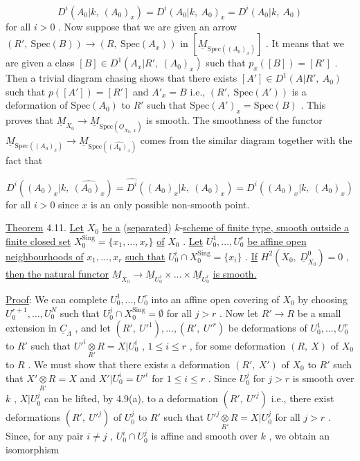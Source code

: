 $$D^i(A_0|k,\ (A_0)_x) = D^i(A_0|k,\ A_0)_x = D^i(A_0|k,\ A_0)$$
for all  $i > 0$ . Now suppose that we are given an arrow $(R',\ \mathrm{Spec}(B)) \to (R,\ \mathrm{Spec}(A_x))$  in  $[\underline{M}_{\mathrm{Spec}((A_0)_x)}]$ . It means that we are given a class $[B] \in D^1(A_x|R',\ (A_0)_x)$  such that  $p_x([B]) = [R']$ . Then a trivial diagram chasing shows that there exists $[A'] \in D^1(A|R',\ A_0)$  such that $p([A']) = [R']$  and  $A'_x = B$  i.e.,  $(R',\ \mathrm{Spec}(A'))$  is a deformation of  $\mathrm{Spec}(A_0)$ to  $R'$  such that  $\mathrm{Spec}(A')_x = \mathrm{Spec}(B)$ . This proves that $\underline{M}_{X_0} \to \underline{M}_{\mathrm{Spec}(\underline{O}_{X_0,\ x})}$ is smooth. The smoothness of the functor  $\underline{M}_{\mathrm{Spec}((A_0)_x)} \to \underline{M}_{\mathrm{Spec}(\widehat{(A_0)_x})}$ comes from the similar diagram together with the fact that

$$D^i((A_0)_x|k,\ \widehat{(A_0)_x}) = \widehat{D^i}((A_0)_x|k,\ (A_0)_x) = D^i((A_0)_x|k,\ (A_0)_x)$$
for all  $i > 0$  since  $x$  is an only possible non-smooth point.

\underline{Theorem} 4.11.  \underline{Let}  $X_0$  \underline{be a} (\underline{separated}) $k$-\underline{scheme of finite type, smooth outside a finite closed set}  $X_0^{\mathrm{Sing}} = \{x_1,\dots,x_r\}$  \underline{of}  $X_0$ . \underline{Let}  $U_0^1,\dots,U_0^r$  \underline{be affine open neighbourhoods of}  $x_1,\dots,x_r$  \underline{such that}  $U_0^i \cap X_0^{\mathrm{Sing}} = \{x_i\}$ . \underline{If} $H^2(X_0,\ \underline{D}^0_{X_0}) = 0$ , \underline{then the natural functor}  $\underline{M}_{X_0} \to \underline{M}_{U_0^1} \times\dots\times \underline{M}_{U_0^r}$   \underline{is smooth.}

\underline{Proof}: We can complete  $U_0^1, \dots ,U_0^r$  into an affine open covering of  $X_0$  by choosing $U_0^{r+1},\dots,U_0^N$  such that   $U_0^j \cap X_0^{\mathrm{Sing}} = \emptyset$  for all  $j > r$ . Now let $R' \to R$  be a small extension in  $\underline{C}_{\Lambda}$ , and let  $(R',\ U'^1),\dots,(R',\ U'^r)$  be deformations of  $U_0^1,\dots,U_0^r$  to  $R'$  such that  $U'^i \underset{R'}{\otimes} R = X|U_0^i$ ,  $1 \le i \le r$ , for
some deformation  $(R,\ X)$  of  $X_0$  to  $R$ . We must show that there exists a deformation  $(R',\ X')$  of  $X_0$  to  $R'$  such that  $X' \underset{R'}{\otimes} R = X$  and  $X'|U_0^i = U'^i$  for $1 \le i \le r$ . Since  $U_0^j$  for  $j > r$  is smooth over  $k$ ,  $X|U_0^j$  can be lifted, by 4.9(a), to a deformation  $(R',\ U'^j)$  i.e., there exist deformations  $(R',\ U'^j)$ of  $U_0^j$  to  $R'$  such that  $U'^j \underset{R'}{\otimes} R = X|U_0^j$  for all  $j > r$ . Since, for any pair $i \ne j$ ,  $U_0^i \cap U_0^j$  is affine and smooth over  $k$ , we obtain an isomorphism

